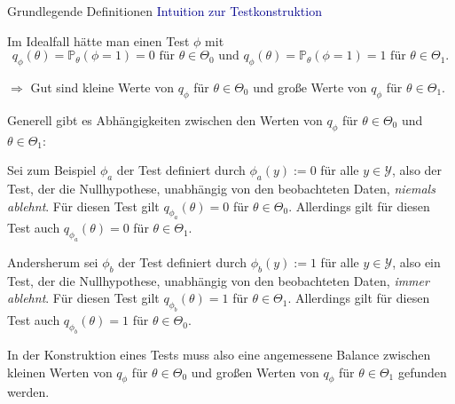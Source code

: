 \documentclass[
  8pt,
  ignorenonframetext,
]{beamer}
\begin{document}
\begin{frame}{Grundlegende Definitionen}
\protect\hypertarget{grundlegende-definitionen-10}{}
\textcolor{darkblue}{Intuition zur Testkonstruktion} \small

Im Idealfall hätte man einen Test \(\phi\) mit \begin{equation}
q_\phi(\theta) = \mathbb{P}_\theta(\phi = 1) = 0 \mbox{ für } \theta \in \Theta_0 \mbox{ und }
q_\phi(\theta) = \mathbb{P}_\theta(\phi = 1) = 1 \mbox{ für } \theta \in \Theta_1.
\end{equation}

\(\Rightarrow\) Gut sind kleine Werte von \(q_\phi\) für
\(\theta \in \Theta_0\) und große Werte von \(q_\phi\) für
\(\theta \in \Theta_1\).

Generell gibt es Abhängigkeiten zwischen den Werten von \(q_\phi\) für
\(\theta \in \Theta_0\) und \(\theta \in \Theta_1\):

\footnotesize

Sei zum Beispiel \(\phi_a\) der Test definiert durch \(\phi_a(y) := 0\)
für alle \(y \in \mathcal{Y}\), also der Test, der die Nullhypothese,
unabhängig von den beobachteten Daten, \textit{niemals ablehnt}. Für
diesen Test gilt \(q_{\phi_a}(\theta) = 0\) für \(\theta \in \Theta_0\).
Allerdings gilt für diesen Test auch \(q_{\phi_a}(\theta) = 0\) für
\(\theta \in \Theta_1\).

Andersherum sei \(\phi_b\) der Test definiert durch \(\phi_b(y) := 1\)
für alle \(y \in \mathcal{Y}\), also ein Test, der die Nullhypothese,
unabhängig von den beobachteten Daten, \textit{immer ablehnt}. Für
diesen Test gilt \(q_{\phi_b}(\theta) = 1\) für \(\theta \in \Theta_1\).
Allerdings gilt für diesen Test auch \(q_{\phi_b}(\theta) = 1\) für
\(\theta \in \Theta_0\).

\small

In der Konstruktion eines Tests muss also eine angemessene Balance
zwischen kleinen Werten von \(q_\phi\) für \(\theta \in \Theta_0\) und
großen Werten von \(q_\phi\) für \(\theta \in \Theta_1\) gefunden
werden.
\end{frame}
\end{document}
